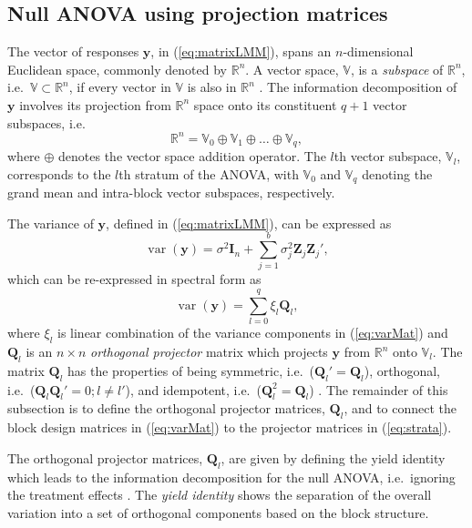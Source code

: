 \documentclass[article]{jss}
\newcommand{\I}{\mathbf{I}}
\newcommand{\Z}{\mathbf{Z}}
\newcommand{\Q}{\mathbf{Q}}
\begin{document}
\subsection{Null ANOVA using projection matrices}
\label{subsec:strataDecompProj}
The vector of responses $\bm{y}$, in (\ref{eq:matrixLMM}), spans an $n$-dimensional Euclidean space, commonly denoted by $\mathbb{R}^n$. A vector space, $\mathbb{V}$, is a \emph{subspace} of $\mathbb{R}^n$, i.e.\ $\mathbb{V} \subset \mathbb{R}^n$, if every vector in $\mathbb{V}$ is also in $\mathbb{R}^n$ \citep{Hadi1996}. The information decomposition of $\bm{y}$ involves its projection from $\mathbb{R}^n$ space onto its constituent $q + 1$ vector subspaces, i.e.\
\begin{equation}
\label{eq:vecSpace}
\mathbb{R}^n = \mathbb{V}_0 \oplus \mathbb{V}_1 \oplus \dots \oplus \mathbb{V}_{q},
\end{equation} 
where $\oplus$ denotes the vector space addition operator. The $l$th vector subspace, $\mathbb{V}_l$, corresponds to the $l$th stratum of the ANOVA, with $\mathbb{V}_0$ and $\mathbb{V}_{q}$ denoting the grand mean and intra-block vector subspaces, respectively. 

The variance of $\bm{y}$, defined in (\ref{eq:matrixLMM}), can be expressed as
\begin{equation}
\label{eq:varMat}
\operatorname{var}(\bm{y}) = \sigma^2\I_n + \sum_{j=1}^{b} \sigma_j^2 \Z_j\Z_j',
\end{equation}
which can be re-expressed in spectral form as 
\begin{equation}
\label{eq:strata}
\operatorname{var}(\bm{y}) = \sum_{l=0}^{q} \xi_l \Q_l,
\end{equation}
where $\xi_l$ is linear combination of the variance components in (\ref{eq:varMat}) and $\Q_l$ is an $n \times n$ \emph{orthogonal projector} matrix which projects $\bm{y}$ from $\mathbb{R}^n$ onto $\mathbb{V}_l$. The matrix $\Q_l$ has the properties of being symmetric, i.e.\ ($\Q_l' = \Q_l$), orthogonal, i.e.\ ($\Q_l\Q_{l}' = 0; l \neq l'$), and idempotent, i.e.\ ($\Q_l^2 = \Q_l$) \citep{Hadi1996}. The remainder of this subsection is to define the orthogonal projector matrices, $\Q_l$, and to connect the block design matrices in (\ref{eq:varMat}) to the projector matrices in (\ref{eq:strata}).

The orthogonal projector matrices, $\Q_l$, are given by defining the yield identity which leads to the information decomposition for the null ANOVA, i.e.\ ignoring the treatment effects \citep{Nelder1965A}. The \emph{yield identity} shows the separation of the overall variation into a set of orthogonal components based on the block structure.
\end{document}
